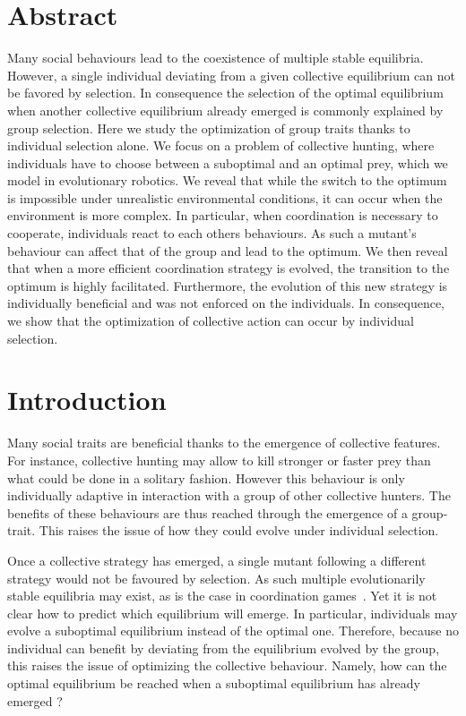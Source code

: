 \section{Abstract}
  Many social behaviours lead to the coexistence of multiple stable equilibria. However, a single individual deviating from a given collective equilibrium can not be favored by selection. In consequence the selection of the optimal equilibrium when another collective equilibrium already emerged is commonly explained by group selection. Here we study the optimization of group traits thanks to individual selection alone. We focus on a problem of collective hunting, where individuals have to choose between a suboptimal and an optimal prey, which we model in evolutionary robotics. We reveal that while the switch to the optimum is impossible under unrealistic environmental conditions, it can occur when the environment is more complex. In particular, when coordination is necessary to cooperate, individuals react to each others behaviours. As such a mutant's behaviour can affect that of the group and lead to the optimum. We then reveal that when a more efficient coordination strategy is evolved, the transition to the optimum is highly facilitated. Furthermore, the evolution of this new strategy is individually beneficial and was not enforced on the individuals. In consequence, we show that  the optimization of collective action can occur by individual selection.


\section{Introduction}
  Many social traits are beneficial thanks to the emergence of collective features. For instance, collective hunting may allow to kill stronger or faster prey than what could be done in a solitary fashion. However this behaviour is only individually adaptive in interaction with a group of other collective hunters. The benefits of these behaviours are thus reached through the emergence of a group-trait. This raises the issue of how they could evolve under individual selection.

  Once a collective strategy has emerged, a single mutant following a different strategy would not be favoured by selection. As such multiple evolutionarily stable equilibria may exist, as is the case in coordination games~\parencite{MaynardSmith1982a, Skyrms2004}. Yet it is not clear how to predict which equilibrium will emerge. In particular, individuals may evolve a suboptimal equilibrium instead of the optimal one. Therefore, because no individual can benefit by deviating from the equilibrium evolved by the group, this raises the issue of optimizing the collective behaviour. Namely, how can the optimal equilibrium be reached when a suboptimal equilibrium has already emerged ?

